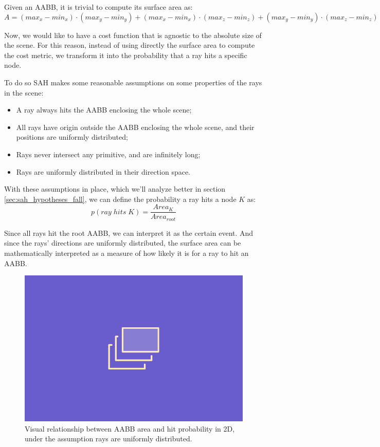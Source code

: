 \documentclass{PoliMi_MasterThesis}
\begin{document}
Given an AABB, it is trivial to compute its surface area as: 
$$A=(max_x-min_x)\cdot (max_y-min_y) + (max_x-min_x)\cdot (max_z-min_z) + (max_y-min_y)\cdot (max_z-min_z)$$

Now, we would like to have a cost function that is agnostic to the absolute size of the scene. For this reason, instead of using directly the surface area to compute the cost metric, we transform it into the probability that a ray hits a specific node.

To do so SAH makes some reasonable assumptions on some properties of the rays in the scene:
\begin{itemize}
	\item A ray always hits the AABB enclosing the whole scene;
	\item All rays have origin outside the AABB enclosing the whole scene, and their positions are uniformly distributed;
	\item Rays never intersect any primitive, and are infinitely long;
	\item Rays are uniformly distributed in their direction space.
\end{itemize}

With these assumptions in place, which we'll analyze better in section \ref{sec:sah_hypotheses_fall}, we can define the probability a ray hits a node $K$ as:
$$p(ray\; hits\; K) = \frac{Area_K}{Area_{root}}$$

Since all rays hit the root AABB, we can interpret it as the certain event. And since the rays' directions are uniformly distributed, the surface area can be mathematically interpreted as a measure of how likely it is for a ray to hit an AABB.

\begin{figure}[H]
    \centering
    \includegraphics[scale=0.5]{Images/TODO.png}
    \caption{Visual relationship between AABB area and hit probability in 2D, under the assumption rays are uniformly distributed.}
    \label{fig:area_probability_visual}
\end{figure}
\end{document}
